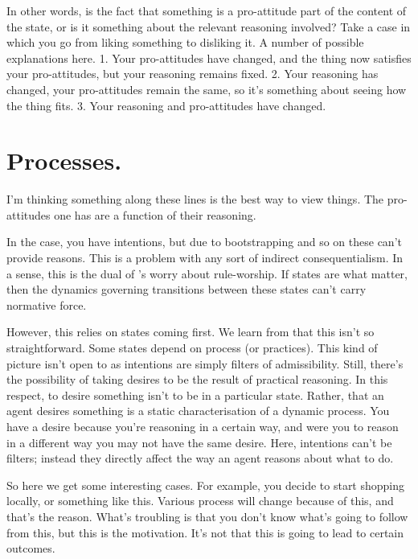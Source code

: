 \documentclass[10pt]{article}
\begin{document}
In other words, is the fact that something is a pro-attitude part of the content of the state, or is it something about the relevant reasoning involved?
Take a case in which you go from liking something to disliking it.
A number of possible explanations here.
1. Your pro-attitudes have changed, and the thing now satisfies your pro-attitudes, but your reasoning remains fixed.
2. Your reasoning has changed, your pro-attitudes remain the same, so it's something about seeing how the thing fits.
3. Your reasoning and pro-attitudes have changed.


\newpage

\section{Processes.}
\label{sec:processes}

I'm thinking something along these lines is the best way to view things.
The pro-attitudes one has are a function of their reasoning.

In the \citeauthor{Bratman:1987aa} case, you have intentions, but due to bootstrapping and so on these can't provide reasons.
This is a problem with any sort of indirect consequentialism.
In a sense, this is the dual of \citeauthor{Smart:1956aa}'s worry about rule-worship.
If states are what matter, then the dynamics governing transitions between these states can't carry normative force.

However, this relies on states coming first.
We learn from \citeauthor{Rawls:1955aa} that this isn't so straightforward.
Some states depend on process (or practices).
This kind of picture isn't open to \citeauthor{Bratman:1987aa} as intentions are simply filters of admissibility.
Still, there's the possibility of taking desires to be the result of practical reasoning.
In this respect, to desire something isn't to be in a particular state.
Rather, that an agent desires something is a static characterisation of a dynamic process.
You have a desire because you're reasoning in a certain way, and were you to reason in a different way you may not have the same desire.
Here, intentions can't be filters; instead they directly affect the way an agent reasons about what to do.

So here we get some interesting cases.
For example, you decide to start shopping locally, or something like this.
Various process will change because of this, and that's the reason.
What's troubling is that you don't know what's going to follow from this, but this is the motivation.
It's not that this is going to lead to certain outcomes.
\end{document}
